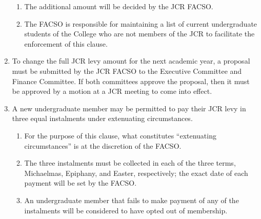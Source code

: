 \documentclass[12pt]{article}
\begin{document}
\begin{enumerate}
    \begin{enumerate}
        \item The additional amount will be decided by the JCR FACSO.
        \item The FACSO is responsible for maintaining a list of current undergraduate students of the College who are not members of the JCR to facilitate the enforcement of this clause.
    \end{enumerate}
    \item To change the full JCR levy amount for the next academic year, a proposal must be submitted by the JCR FACSO to the Executive Committee and Finance Committee. If both committees approve the proposal, then it must be approved by a motion at a JCR meeting to come into effect.
    \item A new undergraduate member may be permitted to pay their JCR levy in three equal instalments under extenuating circumstances.
    \begin{enumerate}
        \item For the purpose of this clause, what constitutes ``extenuating circumstances'' is at the discretion of the FACSO.
        \item The three instalments must be collected in each of the three terms, Michaelmas, Epiphany, and Easter, respectively; the exact date of each payment will be set by the FACSO.
        \item An undergraduate member that fails to make payment of any of the instalments will be considered to have opted out of membership.
    \end{enumerate}

\end{enumerate}
\end{document}
